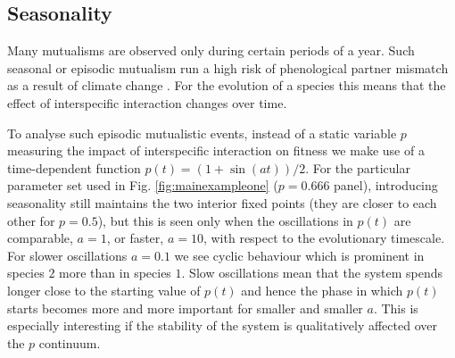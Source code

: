 \documentclass[12pt]{article}
\begin{document}
\subsection{Seasonality}

Many mutualisms are observed only during certain periods of a year.
Such seasonal or episodic mutualism run a high risk of phenological partner mismatch as a result of climate change \citep{rafferty:Oikos:2015}.
For the evolution of a species this means that the effect of interspecific interaction changes over time.

To analyse such episodic mutualistic events, instead of a static variable $p$ measuring the impact of interspecific interaction on fitness we make use of a time-dependent function $p(t) = (1 + \sin(a t))/2 $.
For the particular parameter set used in Fig. \ref{fig:mainexampleone} ($p=0.666$ panel), introducing seasonality still maintains the two interior fixed points (they are closer to each other for $p = 0.5$), but this is seen only when the oscillations in $p(t)$  are comparable, $a=1$, or faster, $a=10$, with respect to the evolutionary timescale.
For slower oscillations $a=0.1$ we see cyclic behaviour which is prominent in species $2$ more than in species $1$.
Slow oscillations mean that the system spends longer close to the starting value of $p(t)$ and hence the phase in which $p(t)$ starts becomes more and more important for smaller and smaller $a$. 
This is especially interesting if the stability of the system is qualitatively affected over the $p$ continuum.
\end{document}
